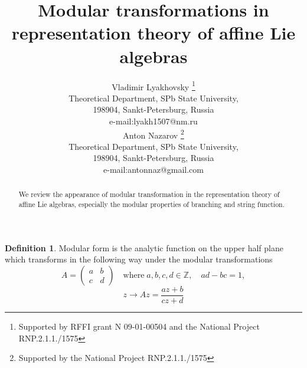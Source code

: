 \documentclass[a4paper,12pt]{article}
\theoremstyle{definition} \newtheorem{Def}{Definition}
\begin{document}
\title{Modular transformations in representation theory of affine Lie algebras}
\author{Vladimir Lyakhovsky \thanks{ Supported by
 RFFI grant N 09-01-00504 and the National Project RNP.2.1.1./1575 }\\
Theoretical Department, SPb State University,\\
198904, Sankt-Petersburg, Russia \\
e-mail:lyakh1507@nm.ru \\
[5mm] Anton Nazarov \thanks{ Supported by
the National Project RNP.2.1.1./1575 }\\
Theoretical Department, SPb State University,\\
198904, Sankt-Petersburg, Russia \\
e-mail:antonnaz@gmail.com
}
\maketitle

\begin{abstract}
  We review the appearance of modular transformation in the representation theory of affine Lie algebras, especially the modular properties of branching and string function.
\end{abstract}
\begin{Def}
  Modular form is the analytic function on the upper half plane which transforms in the following way under the modular transformations
  \begin{equation}
    \label{eq:1}
    A=
    \begin{pmatrix} a & b\\ c & d
    \end{pmatrix} \quad\mbox{where}\; a,b,c,d\in\mathbb{Z},\quad ad-bc=1,
  \end{equation}
  \begin{equation}
    \label{eq:2}
    z\to A z=\frac{az+b}{cz+d}
  \end{equation}
\end{Def}
\end{document}
